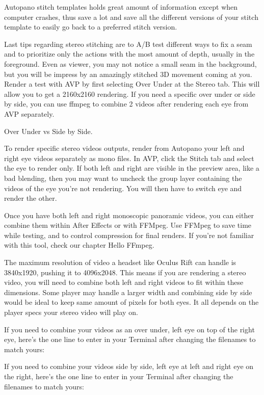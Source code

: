 \begin{fullwidth}
Autopano stitch templates holds great amount of information except when computer crashes, thus save a lot and save all the different versions of your stitch template to easily go back to a preferred stitch version. 
\clearpage


Last tips regarding stereo stitching are to A/B test different ways to fix a seam and to prioritize only the actions with the most amount of depth, usually in the foreground. Even as viewer, you may not notice a small seam in the background, but you will be impress by an amazingly stitched 3D movement coming at you. Render a test with AVP by first selecting Over Under at the Stereo tab. This will allow you to get a 2160x2160 rendering. If you need a specific over under or side by side, you can use ffmpeg to combine 2 videos after rendering each eye from AVP separately.

\clearpage
{\large Over Under vs Side by Side. \par}

To render specific stereo videos outputs, render from Autopano your left and right eye videos separately as mono files. In AVP, click the Stitch tab and select the eye to render only. If both left and right are visible in the preview area, like a bad blending, then you may want to uncheck the group layer containing the videos of the eye you’re not rendering. You will then have to switch eye and render the other.

Once you have both left and right monoscopic panoramic videos, you can either combine them within After Effects or with FFMpeg. Use FFMpeg to save time while testing, and to control compression for final renders. If you’re not familiar with this tool, check our chapter Hello FFmpeg. 

The maximum resolution of video a headset like Oculus Rift can handle is 3840x1920, pushing it to 4096x2048. This means if you are rendering a stereo video, you will need to combine both left and right videos to fit within these dimensions. Some player may handle a larger width and combining side by side would be ideal to keep same amount of pixels for both eyes. It all depends on the player specs your stereo video will play on. 

If you need to combine your videos as an over under, left eye on top of the right eye, here’s the one line to enter in your Terminal after changing the filenames to match yours:


If you need to combine your videos side by side, left eye at left and right eye on the right, here’s the one line to enter in your Terminal after changing the filenames to match yours:




\clearpage
\end{fullwidth}
